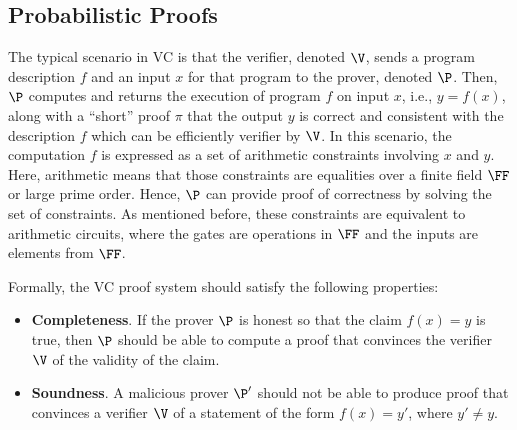 



\subsection{Probabilistic Proofs}

The typical scenario in VC is that the verifier, denoted $\V$, sends a program description $f$ and an input $x$ for that program to the prover, denoted $\P$. Then, $\P$ computes and returns the execution of program $f$ on input $x$, i.e., $y = f(x)$, along with a \enquote{short} proof $\pi$ that the output $y$ is correct and consistent with the description $f$ which can be efficiently verifier by $\V$. In this scenario, the computation $f$ is expressed as a set of arithmetic constraints involving $x$ and $y$. Here, arithmetic means that those constraints are equalities over a finite field $\FF$ or large prime order. Hence, $\P$ can provide proof of correctness by solving the set of constraints. As mentioned before, these constraints are equivalent to arithmetic circuits, where the gates are operations in $\FF$ and the inputs are elements from $\FF$. 

Formally, the VC proof system should satisfy the following properties:
\begin{itemize}
\item \textbf{Completeness}. If the prover $\P$ is honest so that the claim $f(x) = y$ is true, then $\P$ should be able to compute a proof that convinces the verifier $\V$ of the validity of the claim.

\item \textbf{Soundness}. A malicious prover $\P'$ should not be able to produce proof that convinces a verifier $\V$ of a statement of the form $f(x) = y'$, where $y' \neq y$. 
\end{itemize}

